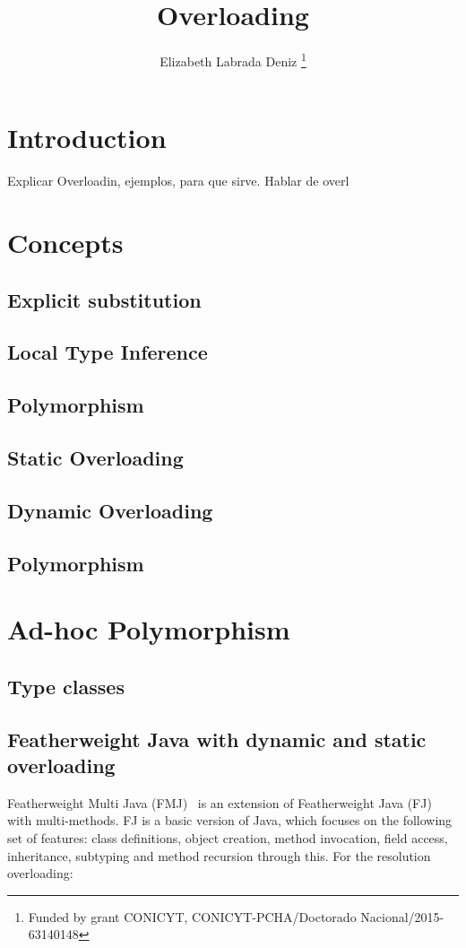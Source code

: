 \documentclass{article}
\title{\bf Overloading}
\author{Elizabeth Labrada Deniz
\thanks{Funded by grant CONICYT, CONICYT-PCHA/Doctorado Nacional/2015-63140148}}
\affil{Computer Science Department (DCC), University of Chile, Chile}
\date{}
\begin{document}
	\maketitle
	\renewcommand{\abstractname}{Abstract}	
	\begin{abstract}
	\end{abstract}	
\section{Introduction}
Explicar Overloadin, ejemplos, para que sirve. Hablar de overl
\section{Concepts}\label{section:concepts}
\subsection{Explicit substitution}
\subsection{Local Type Inference}
\subsection{Polymorphism}
\subsection{Static Overloading}
\subsection{Dynamic Overloading}
\subsection{Polymorphism}
\section{Ad-hoc Polymorphism}\label{section:polymorphism}
\subsection{Type classes}
\subsection{Featherweight Java with dynamic and static overloading}
Featherweight Multi Java (FMJ)~\cite{BETTINI2009261, FJM} is an extension of Featherweight Java (FJ)~\cite{FJ} with multi-methods. FJ is a basic version of Java, which focuses on the following set of features: class definitions, object creation, method invocation, field access, inheritance, subtyping and method recursion through this. For the resolution overloading:
\end{document}
